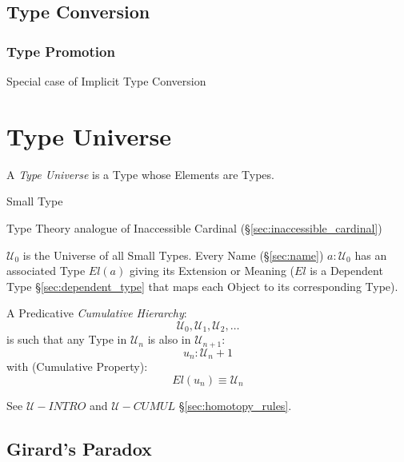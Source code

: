 \subsection{Type Conversion}\label{sec:type_conversion}

\subsubsection{Type Promotion}\label{sec:type_promotion}

Special case of Implicit Type Conversion



\section{Type Universe}\label{sec:type_universe}

A \emph{Type Universe} is a Type whose Elements are Types.

Small Type %

Type Theory analogue of Inaccessible Cardinal
(\S\ref{sec:inaccessible_cardinal})

$\mathcal{U}_0$ is the Universe of all Small Types. Every Name
(\S\ref{sec:name}) $a:\mathcal{U}_0$ has an associated Type $El(a)$
giving its Extension or Meaning ($El$ is a Dependent Type
\S\ref{sec:dependent_type} that maps each Object to its corresponding
Type).

A Predicative \emph{Cumulative Hierarchy}:
\[
  \mathcal{U}_0, \mathcal{U}_1, \mathcal{U}_2, \ldots
\]
is such that any Type in $\mathcal{U}_n$ is also in
$\mathcal{U}_{n+1}$:
\[
  u_n:\mathcal{U}_n+1
\]
with (Cumulative Property):
\[
  El(u_n) \equiv \mathcal{U}_n
\]

See $\mathcal{U}-INTRO$ and $\mathcal{U}-CUMUL$
\S\ref{sec:homotopy_rules}.



\subsection{Girard's Paradox}\label{sec:girards_paradox}



